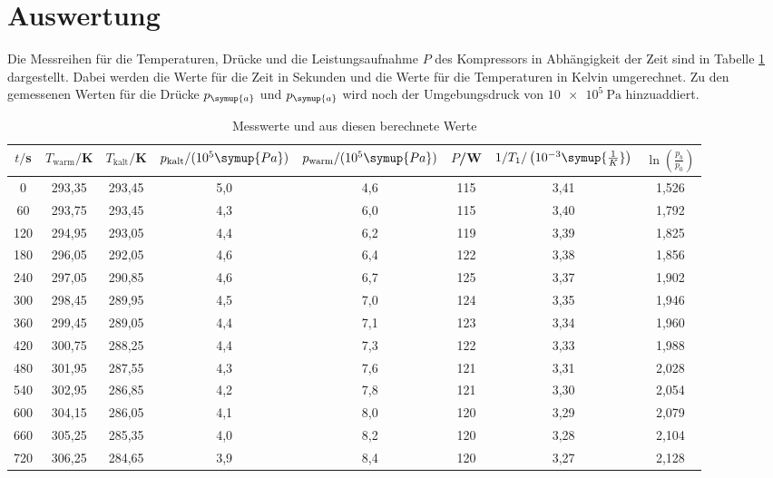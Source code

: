 \section{Auswertung}
\label{sec:Auswertung}
Die Messreihen für die Temperaturen, Drücke und die Leistungsaufnahme $P$ des Kompressors
in Abhängigkeit der Zeit sind in Tabelle \ref{tab:messwerte} dargestellt. Dabei
werden die Werte für die Zeit in Sekunden und die Werte für die Temperaturen in Kelvin
umgerechnet. Zu den gemessenen Werten für die Drücke $p_{\symup{a}}$ und
$p_{\symup{a}}$ wird noch der Umgebungsdruck von $\SI{10e5}{\pascal}$ hinzuaddiert.

\begin{table}[H]
  \centering
  \caption{Messwerte und aus diesen berechnete Werte}
  \label{tab:messwerte}
  \begin{tabular}{c c c c c c c c}
    \toprule
    $t/$s & $T_{\text{warm}}/$K & $T_{\text{kalt}}/$K & $p_{\text{kalt}}/(10^{5}\symup{Pa})$ & $p_{\text{warm}}/(10^{5}\symup{Pa})$ &
    $P$/W & $1/T_1/\left(10^{-3}\symup{\frac{1}{K}}\right)$ & $\ln\left(\frac{p_b}{p_0}\right)$ \\
    \midrule
    0	    &  293,35	 & 	293,45 	&	 5,0	&  4,6   &  115  &  3,41	&   1,526  \\
    60    &	 293,75  & 	293,45 	&	 4,3	&  6,0   & 	115	 &  3,40 	&   1,792  \\
    120   &	 294,95  & 	293,05	&	 4,4	&  6,2   & 	119  &	3,39 	&   1,825 \\
    180	  &  296,05  & 	292,05	&	 4,6	&  6,4   & 	122	 &  3,38 	&   1,856  \\
    240	  &  297,05  & 	290,85	&	 4,6	&  6,7	 &  125	 &  3,37 	&   1,902 \\
    300	  &  298,45  & 	289,95	&	 4,5	&  7,0	 &  124  &	3,35	&   1,946 \\
    360	  &  299,45  & 	289,05	&	 4,4	&  7,1 	 &  123	 &  3,34	&   1,960 \\
    420	  &  300,75  & 	288,25	&	 4,4	&  7,3	 &  122  &	3,33	&   1,988 \\
    480	  &  301,95  & 	287,55	&	 4,3	&  7,6 	 &  121	 &  3,31	&   2,028 \\
    540	  &  302,95  & 	286,85	&	 4,2	&  7,8 	 &  121  &	3,30	&   2,054  \\
    600   &	 304,15  & 	286,05	&	 4,1	&  8,0	 &  120	 &  3,29	&   2,079  \\
    660   &	 305,25  & 	285,35	&	 4,0	&  8,2 	 &  120	 &  3,28	&   2,104 \\
    720   &	 306,25  & 	284,65	&	 3,9	&  8,4	 &  120  &	3,27	&   2,128 \\

\end{tabular}
\end{table}
